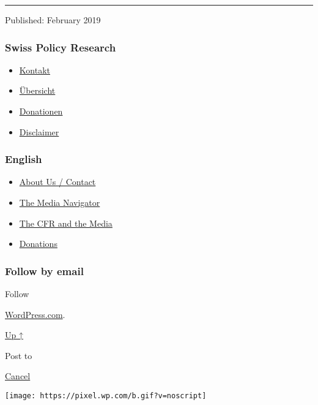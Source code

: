 \begin{center}\rule{0.5\linewidth}{\linethickness}\end{center}

Published: February 2019

\hypertarget{swiss-policy-research}{%
\subsubsection{Swiss Policy Research}\label{swiss-policy-research}}

\begin{itemize}
\tightlist
\item
  \href{https://swprs.org/kontakt/}{Kontakt}
\item
  \href{https://swprs.org/uebersicht/}{Übersicht}
\item
  \href{https://swprs.org/donationen/}{Donationen}
\item
  \href{https://swprs.org/disclaimer/}{Disclaimer}
\end{itemize}

\hypertarget{english}{%
\subsubsection{English}\label{english}}

\begin{itemize}
\tightlist
\item
  \href{https://swprs.org/contact/}{About Us / Contact}
\item
  \href{https://swprs.org/media-navigator/}{The Media Navigator}
\item
  \href{https://swprs.org/the-american-empire-and-its-media/}{The CFR
  and the Media}
\item
  \href{https://swprs.org/donations/}{Donations}
\end{itemize}

\hypertarget{follow-by-email}{%
\subsubsection{Follow by email}\label{follow-by-email}}

Follow

\href{https://wordpress.com/?ref=footer_custom_com}{WordPress.com}.

\protect\hyperlink{}{Up ↑}

Post to

\protect\hyperlink{}{Cancel}

\texttt{[image: https://pixel.wp.com/b.gif?v=noscript]}
